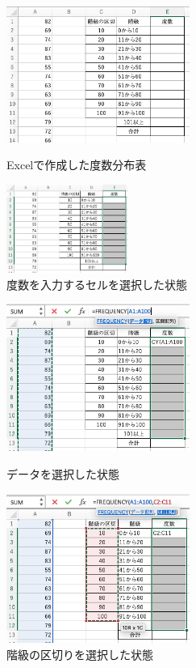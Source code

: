 \begin{figure}[htbp]
    \begin{minipage}{0.5\hsize}
        \centering
        \includegraphics[width=6cm]{chap1/before_freq.png}
        \caption{Excelで作成した度数分布表}
        \label{fig:before_freq}
    \end{minipage}
    \begin{minipage}{0.5\hsize}
        \centering
        \includegraphics[width=4cm]{chap1/select_cells_freq.png}
        \caption{度数を入力するセルを選択した状態}
        \label{fig:select_cells_freq}
    \end{minipage}
\end{figure}


\begin{figure}[htbp]
    \begin{minipage}{0.5\hsize}
        \centering
        \includegraphics[width=6cm]{chap1/select_data_freq.png}
        \caption{データを選択した状態}
        \label{fig:select_data_freq}
    \end{minipage}
    \begin{minipage}{0.5\hsize}
        \centering
        \includegraphics[width=6cm]{chap1/select_classes_freq.png}
        \caption{階級の区切りを選択した状態}
        \label{fig:select_classes_freq}
    \end{minipage}
\end{figure}

